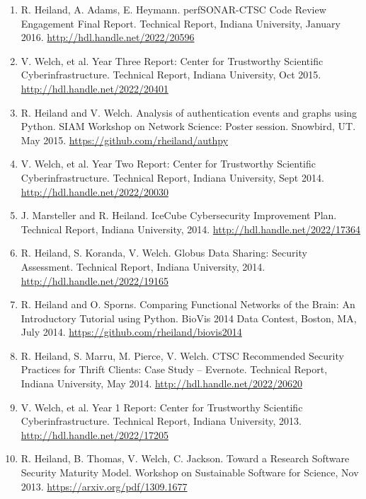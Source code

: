 \documentclass[11pt]{article}
\begin{document}
\begin{enumerate}[leftmargin=*, itemsep=3pt, topsep=4pt]
    \item R. Heiland, A. Adams, E. Heymann. perfSONAR-CTSC Code Review Engagement Final Report. Technical Report, Indiana University, January 2016. \url{http://hdl.handle.net/2022/20596}

    \item V. Welch, et al. Year Three Report: Center for Trustworthy Scientific Cyberinfrastructure. Technical Report, Indiana University, Oct 2015. \url{http://hdl.handle.net/2022/20401}

    \item R. Heiland and V. Welch. Analysis of authentication events and graphs using Python. SIAM Workshop on Network Science: Poster session. Snowbird, UT. May 2015. \url{https://github.com/rheiland/authpy}

    \item V. Welch, et al. Year Two Report: Center for Trustworthy Scientific Cyberinfrastructure. Technical Report, Indiana University, Sept 2014. \url{http://hdl.handle.net/2022/20030}

    \item J. Marsteller and R. Heiland. IceCube Cybersecurity Improvement Plan. Technical Report, Indiana University, 2014. \url{http://hdl.handle.net/2022/17364}

    \item R. Heiland, S. Koranda, V. Welch. Globus Data Sharing: Security Assessment. Technical Report, Indiana University, 2014. \url{http://hdl.handle.net/2022/19165}

    \item R. Heiland and O. Sporns. Comparing Functional Networks of the Brain: An Introductory Tutorial using Python. BioVis 2014 Data Contest, Boston, MA, July 2014. \url{https://github.com/rheiland/biovis2014}

    \item R. Heiland, S. Marru, M. Pierce, V. Welch. CTSC Recommended Security Practices for Thrift Clients: Case Study -- Evernote. Technical Report, Indiana University, May 2014. \url{http://hdl.handle.net/2022/20620}

    \item V. Welch, et al. Year 1 Report: Center for Trustworthy Scientific Cyberinfrastructure. Technical Report, Indiana University, 2013. \url{http://hdl.handle.net/2022/17205}

    \item R. Heiland, B. Thomas, V. Welch, C. Jackson. Toward a Research Software Security Maturity Model. Workshop on Sustainable Software for Science, Nov 2013. \url{https://arxiv.org/pdf/1309.1677}


\end{enumerate}
\end{document}
